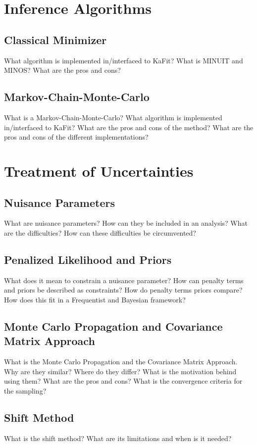 \section{Inference Algorithms}
\subsection{Classical Minimizer}
What algorithm is implemented in/interfaced to KaFit? What is MINUIT and MINOS? What are the pros and cons?
\subsection{Markov-Chain-Monte-Carlo}
What is a Markov-Chain-Monte-Carlo?  What algorithm is implemented in/interfaced to KaFit? What are the pros and cons of the method? What are the pros and cons of the different implementations?

\section{Treatment of Uncertainties}
\subsection{Nuisance Parameters}
What are nuisance parameters? How can they be included in an analysis? What are the difficulties? How can these difficulties be circumvented?
\subsection{Penalized Likelihood and Priors}
What does it mean to constrain a nuisance parameter? How can penalty terms and priors be described as constraints? How do penalty terms priors compare? How does this fit in a Frequentist and Bayesian framework?
\subsection{Monte Carlo Propagation and Covariance Matrix Approach}
What is the Monte Carlo Propagation and the Covariance Matrix Approach. Why are they similar? Where do they differ? What is the motivation behind using them? What are the pros and cons? What is the convergence criteria for the sampling?
\subsection{Shift Method}
What is the shift method? What are its limitations and when is it needed?
